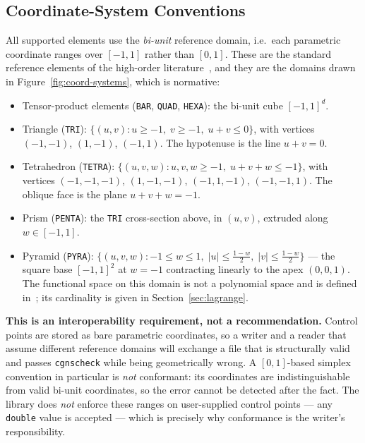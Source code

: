 \documentclass[11pt,letterpaper]{article}
\begin{document}
\subsection{Coordinate-System Conventions}
\label{sec:coord-conventions}

All supported elements use the \emph{bi-unit} reference domain, i.e.\ each parametric
coordinate ranges over $[-1, 1]$ rather than $[0, 1]$.  These are the standard reference
elements of the high-order literature~\cite{HW08}, and they are the domains drawn in
Figure~\ref{fig:coord-systems}, which is normative:

\begin{itemize}
  \item Tensor-product elements (\texttt{BAR}, \texttt{QUAD}, \texttt{HEXA}): the bi-unit
    cube $[-1, 1]^d$.
  \item Triangle (\texttt{TRI}): $\{(u,v) : u \ge -1,\; v \ge -1,\; u+v \le 0\}$, with
    vertices $(-1,-1)$, $(1,-1)$, $(-1,1)$.  The hypotenuse is the line $u+v = 0$.
  \item Tetrahedron (\texttt{TETRA}): $\{(u,v,w) : u,v,w \ge -1,\; u+v+w \le -1\}$, with
    vertices $(-1,-1,-1)$, $(1,-1,-1)$, $(-1,1,-1)$, $(-1,-1,1)$.  The oblique face is the
    plane $u+v+w = -1$.
  \item Prism (\texttt{PENTA}): the \texttt{TRI} cross-section above, in $(u,v)$, extruded
    along $w \in [-1, 1]$.
  \item Pyramid (\texttt{PYRA}): $\{(u,v,w) : -1 \le w \le 1,\;
    |u| \le \tfrac{1-w}{2},\; |v| \le \tfrac{1-w}{2}\}$ --- the square base
    $[-1,1]^2$ at $w = -1$ contracting linearly to the apex $(0,0,1)$.  The
    functional space on this domain is not a polynomial space and is defined
    in~\cite{BCD10}; its cardinality is given in Section~\ref{sec:lagrange}.
\end{itemize}

\noindent\textbf{This is an interoperability requirement, not a recommendation.}  Control
points are stored as bare parametric coordinates, so a writer and a reader that assume
different reference domains will exchange a file that is structurally valid and passes
\texttt{cgnscheck} while being geometrically wrong.  A $[0,1]$-based simplex convention in
particular is \emph{not} conformant: its coordinates are indistinguishable from valid
bi-unit coordinates, so the error cannot be detected after the fact.  The library does
\emph{not} enforce these ranges on user-supplied control points --- any \texttt{double}
value is accepted --- which is precisely why conformance is the writer's responsibility.
\end{document}
